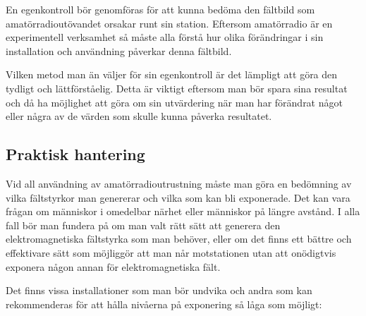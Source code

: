 En egenkontroll bör genomföras för att kunna bedöma den fältbild som
amatörradioutövandet orsakar runt sin station.
Eftersom amatörradio är en experimentell verksamhet så måste alla förstå hur
olika förändringar i sin installation och användning påverkar denna fältbild.

Vilken metod man än väljer för sin egenkontroll är det lämpligt att
göra den tydligt och lättförståelig.
Detta är viktigt eftersom man bör spara sina resultat och då ha möjlighet att
göra om sin utvärdering när man har förändrat något eller några av de värden
som skulle kunna påverka resultatet.

\subsection{Praktisk hantering}
Vid all användning av amatörradioutrustning måste man göra en bedömning
av vilka fältstyrkor man genererar och vilka som kan bli exponerade.
Det kan vara frågan om människor i omedelbar närhet eller människor på
längre avstånd.
I alla fall bör man fundera på om man valt rätt sätt att generera den
elektromagnetiska fältstyrka som man behöver, eller om det finns ett bättre
och effektivare sätt som möjliggör att man når motstationen utan att onödigtvis
exponera någon annan för elektromagnetiska fält.

Det finns vissa installationer som man bör undvika och andra som kan
rekommenderas för att hålla nivåerna på exponering så låga som möjligt:

